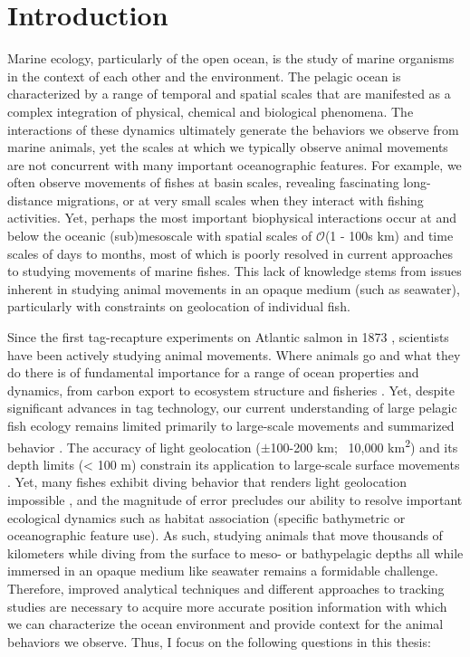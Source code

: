 
\chapter{Introduction}
\raggedbottom
\clearpage


Marine ecology, particularly of the open ocean, is the study of marine organisms in the context of each other and the environment. The pelagic ocean is characterized by a range of temporal and spatial scales that are manifested as a complex integration of physical, chemical and biological phenomena. The interactions of these dynamics ultimately generate the behaviors we observe from marine animals, yet the scales at which we typically observe animal movements are not concurrent with many important oceanographic features. For example, we often observe movements of fishes at basin scales, revealing fascinating long-distance migrations, or at very small scales when they interact with fishing activities. Yet, perhaps the most important biophysical interactions occur at and below the oceanic (sub)mesoscale with spatial scales of $\mathcal{O}$(1 - 100s km) and time scales of days to months, most of which is poorly resolved in current approaches to studying movements of marine fishes. This lack of knowledge stems from issues inherent in studying animal movements in an opaque medium (such as seawater), particularly with constraints on geolocation of individual fish. 

Since the first tag-recapture experiments on Atlantic salmon in 1873 \citep{Everhart1975}, scientists have been actively studying animal movements. Where animals go and what they do there is of fundamental importance for a range of ocean properties and dynamics, from carbon export \citep[\eg][]{Lavery2010a} to ecosystem structure \citep[\eg][]{Thorrold2014} and fisheries \citep[\eg][]{Block2005}. Yet, despite significant advances in tag technology, our current understanding of large pelagic fish ecology remains limited primarily to large-scale movements and summarized behavior \citep{Braun2015}. The accuracy of light geolocation ($\pm$100-200 km; ~10,000 km\textsuperscript{2}) and its depth limits (< 100 m) constrain its application to large-scale surface movements \citep{Braun2015a}. Yet, many fishes exhibit diving behavior that renders light geolocation impossible \citep{Dewar2011}, and the magnitude of error precludes our ability to resolve important ecological dynamics such as habitat association (\eg specific bathymetric or oceanographic feature use). As such, studying animals that move thousands of kilometers while diving from the surface to meso- or bathypelagic depths all while immersed in an opaque medium like seawater remains a formidable challenge. Therefore, improved analytical techniques and different approaches to tracking studies are necessary to acquire more accurate position information with which we can characterize the ocean environment and provide context for the animal behaviors we observe. Thus, I focus on the following questions in this thesis:

